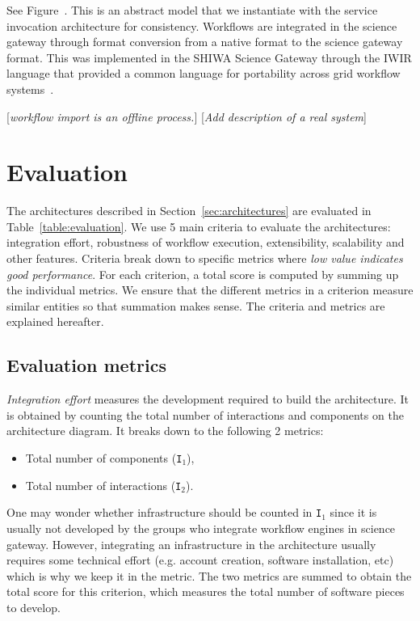 \documentclass[preprint,3p,twocolumn]{elsarticle}
\newcommand{\todo}[1]{\color{blue}\xspace[\emph{#1}]\xspace\color{black}}
\begin{document}
See Figure~. This is an abstract model that we
instantiate with the service invocation architecture for
consistency. Workflows are integrated in the science gateway through
format conversion from a native format to the science gateway
format. This was implemented in the SHIWA Science Gateway through
the IWIR language that provided a common language for portability
across grid workflow
systems~\cite{plankensteiner-prodan-etal:2013}.

\todo{workflow import is an offline process.}
\todo{Add description of a real system}

\section{Evaluation}

The architectures described in Section~\ref{sec:architectures} are
evaluated in Table~\ref{table:evaluation}. We use 5 main criteria to
evaluate the architectures: integration effort, robustness of workflow
execution, extensibility, scalability and other features. Criteria
break down to specific metrics where \emph{low value indicates good
  performance}. For each criterion, a total score is computed by
summing up the individual metrics. We ensure that the different
metrics in a criterion measure similar entities so that summation
makes sense. The
criteria and metrics are explained hereafter.

\subsection{Evaluation metrics}

\emph{Integration effort} measures the development required to build
the architecture. It is obtained by counting the total number of
interactions and components on the architecture diagram. It breaks
down to the following 2 metrics:
\begin{itemize}[leftmargin=0cm,itemindent=0.35cm,itemsep=0cm]
\item Total number of components (\texttt{I$_1$}),
\item Total number of interactions (\texttt{I$_2$}).
\end{itemize}
One may wonder whether infrastructure should be counted in
\texttt{I$_1$} since it is usually not developed by the groups who
integrate workflow engines in science gateway. However, integrating an
infrastructure in the architecture usually requires some technical
effort (e.g. account creation, software installation, etc) which is
why we keep it in the metric. The two metrics are summed to obtain the
total score for this criterion, which measures the total number of
software pieces to develop.
\end{document}
